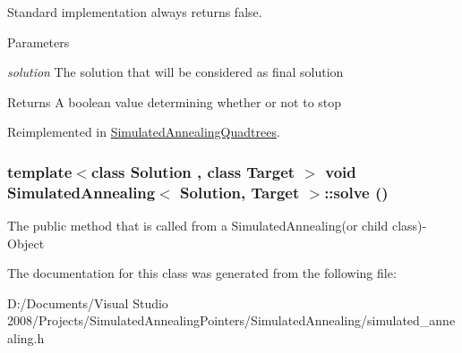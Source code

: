 Standard implementation always returns false. 
\begin{DoxyParams}{Parameters}
\item[{\em solution}]The solution that will be considered as final solution \end{DoxyParams}
\begin{DoxyReturn}{Returns}
A boolean value determining whether or not to stop 
\end{DoxyReturn}


Reimplemented in \hyperlink{class_simulated_annealing_quadtrees_ae402bb212c241a07477e46348f889fdf}{SimulatedAnnealingQuadtrees}.\hypertarget{class_simulated_annealing_ac69c1bcb744cf2946b4196afe8083f8f}{
\subsubsection[{solve}]{\setlength{\rightskip}{0pt plus 5cm}template$<$class Solution , class Target $>$ void {\bf SimulatedAnnealing}$<$ Solution, Target $>$::solve ()}}
\label{class_simulated_annealing_ac69c1bcb744cf2946b4196afe8083f8f}
The public method that is called from a SimulatedAnnealing(or child class)-\/Object 

The documentation for this class was generated from the following file:\begin{DoxyCompactItemize}
\item 
D:/Documents/Visual Studio 2008/Projects/SimulatedAnnealingPointers/SimulatedAnnealing/simulated\_\-annealing.h\end{DoxyCompactItemize}
